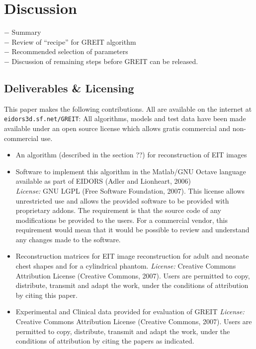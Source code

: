\documentclass[12pt]{iopart}
\begin{document}
\section{Discussion}

$-$ Summary
\\
$-$ Review of ``recipe'' for GREIT algorithm
\\
$-$ Recommended selection of parameters
\\
$-$ Discussion of remaining steps before 
    GREIT can be released.
    


\subsection{Deliverables \& Licensing}

This paper makes the following contributions. All are
available on the internet at \verb+eidors3d.sf.net/GREIT+:
All algorithms, models and test data have been made available
under an open source license which allows
gratis commercial and non-commercial use.
\begin{itemize}
\item An algorithm (described in the section ??) for reconstruction
         of EIT images
\item Software to implement this algorithm in the Matlab/GNU Octave
         language available as part of EIDORS (Adler and Lionheart, 2006)
\\
{\em License:}
    GNU LGPL (Free Software Foundation, 2007).
   This license allows
   unrestricted use and allows the provided software to
   be provided with proprietary addons. The requirement is
   that the source code of any modifications be provided to
   the users. For a commercial vendor, this requirement would
   mean that it would be possible to review and understand any
   changes made to the software.

\item Reconstruction matrices for EIT image reconstruction for
      adult and neonate chest shapes and for a cylindrical phantom.
{\em License:} Creative Commons Attribution
   License (Creative Commons, 2007). Users are permitted
   to copy, distribute, transmit and adapt the work,
   under the conditions of attribution by citing this paper.

\item Experimental and Clinical data provided for evaluation of GREIT
{\em License:} Creative Commons Attribution
   License (Creative Commons, 2007). Users are permitted
   to copy, distribute, transmit and adapt the work,
   under the conditions of attribution by citing the
   papers as indicated.
\end{itemize}
\end{document}
